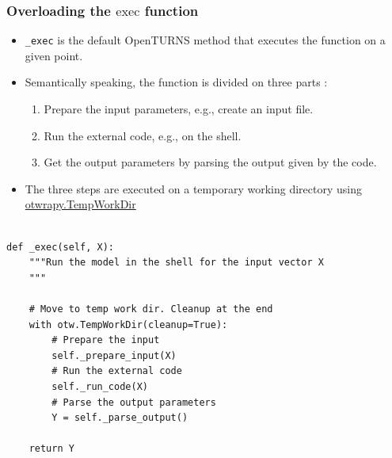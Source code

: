 \documentclass[10pt, aspectratio=169]{beamer}
\begin{document}
\begin{frame}[fragile]
\frametitle{Overloading the $\mathrm{exec}$ function}
\begin{itemize}
	\item \texttt{\_exec} is the default OpenTURNS method that executes the function
  on a given point.
 	\item Semantically speaking, the function is divided on
  three parts :
	\begin{enumerate}
		\item Prepare the input parameters, e.g., create an input file.
		\item Run the external code, e.g., on the shell.
		\item Get the output parameters by parsing the output given by the code.
	\end{enumerate}
\vfill
	\item The three steps are executed on a temporary working directory using  \href{http://openturns.github.io/otwrapy/master/_generated/otwrapy.TempWorkDir.html}{otwrapy.TempWorkDir}
\end{itemize}
\begin{Verbatim}[xleftmargin=10mm]

def _exec(self, X):
    """Run the model in the shell for the input vector X
    """

    # Move to temp work dir. Cleanup at the end
    with otw.TempWorkDir(cleanup=True):
        # Prepare the input
        self._prepare_input(X)
        # Run the external code
        self._run_code(X)
        # Parse the output parameters
        Y = self._parse_output()

    return Y
\end{Verbatim}
\end{frame}
\end{document}
